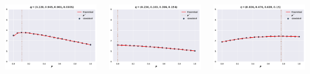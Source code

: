 \documentclass[usenames,dvipsnames,t]{beamer}
\begin{document}
\begin{columns}
\begin{column}{.8\linewidth}
\begin{columns}
    \centering
    \begin{column}{.2\linewidth}
        \vspace{1cm}
        \includegraphics[width=.9\textwidth]{static/plot_one}
    \end{column}
    \begin{column}{.2\linewidth}
        \includegraphics[width=.9\textwidth]{static/plot_two}
    \end{column}
    \begin{column}{.2\linewidth}
        \includegraphics[width=.9\textwidth]{static/plot_three}

\end{column}
\end{columns}
\end{column}
\end{columns}
\end{document}
